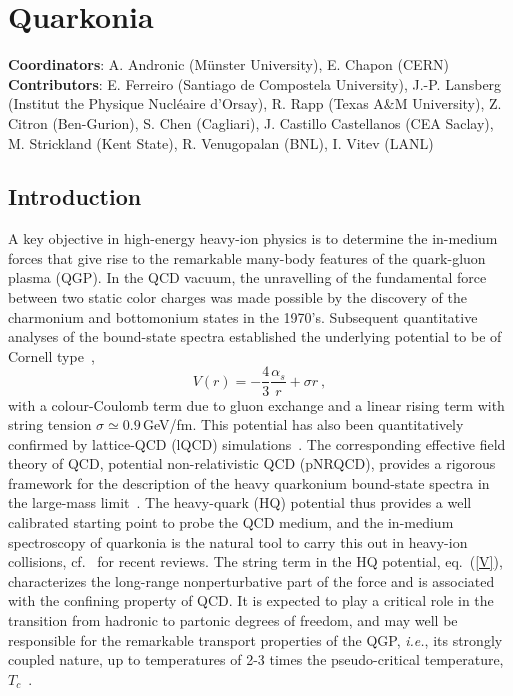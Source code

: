 \documentclass[../report.tex]{subfiles}
\begin{document}
\section{Quarkonia}

\label{sec:quarkonia}

\textbf{Coordinators}: A. Andronic (M\"{u}nster University), E. Chapon (CERN)
\linebreak
\textbf{Contributors}: 
E. Ferreiro (Santiago de Compostela University), J.-P. Lansberg (Institut the Physique Nucl\'{e}aire d'Orsay), R. Rapp (Texas A\&M University),
Z. Citron (Ben-Gurion), S. Chen (Cagliari),
J. Castillo Castellanos (CEA Saclay), 
M. Strickland (Kent State), R. Venugopalan (BNL), I. Vitev (LANL)


\subsection{Introduction}
\label{sec_intro}
A key objective in high-energy heavy-ion physics is to determine the in-medium forces 
that give rise to the remarkable many-body features of the quark-gluon plasma (QGP).
In the QCD vacuum, the unravelling of the fundamental force between two static color charges  
was made possible by the discovery of the charmonium and bottomonium states in the 1970's. 
Subsequent quantitative analyses of the bound-state spectra established the underlying
potential to be of Cornell type~\cite{Eichten:1979ms}, 
\begin{equation}
V(r) = -\frac{4}{3} \frac{\alpha_s}{r} + \sigma r \ ,
\label{V}
\end{equation} 
with a colour-Coulomb term due to gluon exchange and a linear rising term with string
tension $\sigma\simeq0.9$\,GeV/fm. This potential has also been quantitatively confirmed 
by lattice-QCD (lQCD) simulations~\cite{Bali:2000gf}. 
The corresponding effective field theory of QCD, potential non-relativistic QCD
(pNRQCD), provides a rigorous framework for the description of the heavy quarkonium
bound-state spectra in the large-mass limit~\cite{Brambilla:2004wf}.
The heavy-quark (HQ) potential thus provides a well calibrated starting point to probe the 
QCD medium, and the in-medium spectroscopy of quarkonia is the natural tool to carry this 
out in heavy-ion collisions, cf.~\cite{Rapp:2008tf,BraunMunzinger:2009ih,Kluberg:2009wc,Mocsy:2013syh,Liu:2015izf} 
for recent reviews.
The string term in the HQ potential, eq.~(\ref{V}), characterizes the long-range nonperturbative 
part of the force and is associated with the confining property of QCD. It is expected to play 
a critical role in the transition from hadronic to partonic degrees of freedom, and may well be 
responsible for the remarkable transport properties of the QGP, {\it i.e.}, its strongly coupled 
nature, up to temperatures of 2-3 times the pseudo-critical temperature, $T_c$~\cite{Liu:2016ysz}. 
\end{document}
